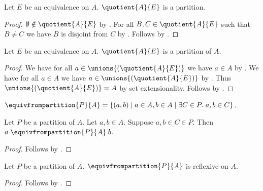 \begin{proposition}\label{quotient_partition}
    Let $E$ be an equivalence on $A$.
    $\quotient{A}{E}$ is a partition.
\end{proposition}
\begin{proof}
    $\emptyset\notin\quotient{A}{E}$ by .
    For all $B, C\in \quotient{A}{E}$ such that $B\neq C$
        we have $B$ is disjoint from $C$ by .
    Follows by .
\end{proof}

\begin{proposition}\label{quotient_partition_of}
    Let $E$ be an equivalence on $A$.
    $\quotient{A}{E}$ is a partition of $A$.
\end{proposition}
\begin{proof}
    We have for all $a\in\unions{(\quotient{A}{E})}$
        we have $a\in A$ by .
    We have for all $a\in A$
        we have $a\in\unions{(\quotient{A}{E})}$
        by .
    Thus $\unions{(\quotient{A}{E})} = A$ by set extensionality.
    Follows by .
\end{proof}



\begin{definition}\label{equivalence_from_partition}
    $\equivfrompartition{P}{A} = \{(a, b)\mid a\in A, b\in A\mid \exists C\in P.\ a, b\in C\}$.
\end{definition}

\begin{proposition}\label{equivalence_from_partition_intro}
    Let $P$ be a partition of $A$.
    Let $a,b\in A$.
    Suppose $a,b\in C\in P$.
    Then $a\mathrel{\equivfrompartition{P}{A}} b$.
\end{proposition}
\begin{proof}
    Follows by .
\end{proof}

\begin{proposition}\label{equivalence_from_partition_reflexive}
    Let $P$ be a partition of $A$.
    $\equivfrompartition{P}{A}$ is reflexive on $A$.
\end{proposition}
\begin{proof}
    Follows by .
\end{proof}


